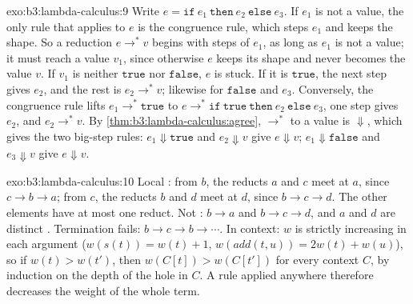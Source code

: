 \begin{solution}{exo:b3:lambda-calculus:9}
Write $e = \mathtt{if}\ e_1\ \mathtt{then}\ e_2\ \mathtt{else}\ e_3$. If $e_1$ is not a value, the only rule that applies to $e$ is the congruence rule, which steps $e_1$ and keeps the shape. So a reduction $e \to^* v$ begins with steps of $e_1$, as long as $e_1$ is not a value; it must reach a value $v_1$, since otherwise $e$ keeps its shape and never becomes the value $v$. If $v_1$ is neither $\mathtt{true}$ nor $\mathtt{false}$, $e$ is stuck. If it is $\mathtt{true}$, the next step gives $e_2$, and the rest is $e_2 \to^* v$; likewise for $\mathtt{false}$ and $e_3$. Conversely, the congruence rule lifts $e_1 \to^* \mathtt{true}$ to $e \to^* \mathtt{if}\ \mathtt{true}\ \mathtt{then}\ e_2\ \mathtt{else}\ e_3$, one step gives $e_2$, and $e_2 \to^* v$. By \cref{thm:b3:lambda-calculus:agree}, $\to^*$ to a value is $\Downarrow$, which gives the two big-step rules: $e_1 \Downarrow \mathtt{true}$ and $e_2 \Downarrow v$ give $e \Downarrow v$; $e_1 \Downarrow \mathtt{false}$ and $e_3 \Downarrow v$ give $e \Downarrow v$.
\end{solution}

\begin{solution}{exo:b3:lambda-calculus:10}
Local : from $b$, the reducts $a$ and $c$ meet at $a$, since $c \to b \to a$; from $c$, the reducts $b$ and $d$ meet at $d$, since $b \to c \to d$. The other elements have at most one reduct. Not : $b \to a$ and $b \to c \to d$, and $a$ and $d$ are distinct . Termination fails: $b \to c \to b \to \cdots$. In context: $w$ is strictly increasing in each argument ($w(s(t)) = w(t) + 1$, $w(\mathit{add}(t, u)) = 2w(t) + w(u)$), so if $w(t) > w(t')$, then $w(C[t]) > w(C[t'])$ for every context $C$, by induction on the depth of the hole in $C$. A rule applied anywhere therefore decreases the weight of the whole term.
\end{solution}

